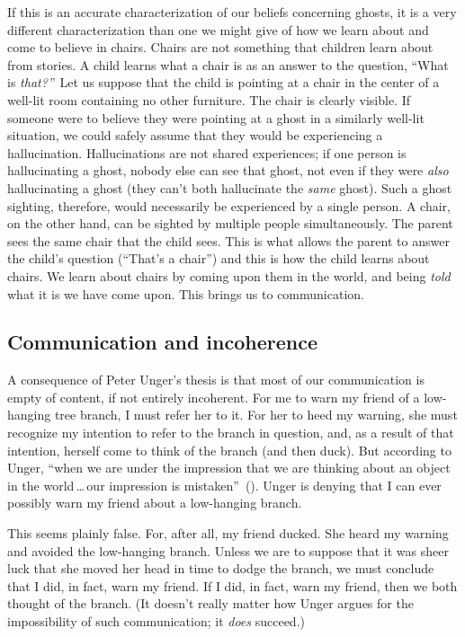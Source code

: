 \documentclass[11pt]{article}
\begin{document}
\begin{spacing}{1.5}
If this is an accurate characterization of our beliefs concerning ghosts, it is a very different characterization than one we might give of how we learn about and come to believe in chairs. Chairs are not something that children learn about from stories. A child learns what a chair is as an answer to the question, ``What is {\em that?}\,'' Let us suppose that the child is pointing at a chair in the center of a well-lit room containing no other furniture. The chair is clearly visible. If someone were to believe they were pointing at a ghost in a similarly well-lit situation, we could safely assume that they would be experiencing a hallucination. Hallucinations are not shared experiences; if one person is hallucinating a ghost, nobody else can see that ghost, not even if they were {\em also} hallucinating a ghost (they can't both hallucinate the {\em same} ghost). Such a ghost sighting, therefore, would necessarily be experienced by a single person. A chair, on the other hand, can be sighted by multiple people simultaneously. The parent sees the same chair that the child sees. This is what allows the parent to answer the child's question (``That's a chair'') and this is how the child learns about chairs. We learn about chairs by coming upon them in the world, and being {\em told} what it is we have come upon. This brings us to communication.

\subsection{Communication and incoherence}
\label{unger-comm}
A consequence of Peter Unger's thesis is that most of our communication is empty of content, if not entirely incoherent. For me to warn my friend of a low-hanging tree branch, I must refer her to it. For her to heed my warning, she must recognize my intention to refer to the branch in question, and, as a result of that intention, herself come to think of the branch (and then duck). But according to Unger, ``when we are under the impression that we are thinking about an object in the world\,\ldots\,our impression is mistaken''~(\citeyear[149]{unger1979}). Unger is denying that I can ever possibly warn my friend about a low-hanging branch.

This seems plainly false. For, after all, my friend ducked. She heard my warning and avoided the low-hanging branch. Unless we are to suppose that it was sheer luck that she moved her head in time to dodge the branch, we must conclude that I did, in fact, warn my friend. If I did, in fact, warn my friend, then we both thought of the branch. (It doesn't really matter how Unger argues for the impossibility of such communication; it {\em does} succeed.)%


\end{spacing}
\end{document}
